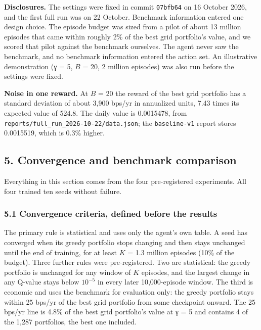 \documentclass[
  11pt]{article}
\begin{document}
\textbf{Disclosures.} The settings were fixed in commit \texttt{07bfb64}
on 16 October 2026, and the first full run was on 22 October. Benchmark
information entered one design choice. The episode budget was sized from
a pilot of about 13 million episodes that came within roughly 2\% of the
best grid portfolio's value, and we scored that pilot against the
benchmark ourselves. The agent never saw the benchmark, and no benchmark
information entered the action set. An illustrative demonstration (γ =
5, \(B\) = 20, 2 million episodes) was also run before the settings were
fixed.

\textbf{Noise in one reward.} At \(B\) = 20 the reward of the best grid
portfolio has a standard deviation of about 3,900 bps/yr in annualized
units, 7.43 times its expected value of 524.8. The daily value is
0.0015478, from \texttt{reports/full\_run\_2026-10-22/data.json}; the
\texttt{baseline-v1} report stores 0.0015519, which is 0.3\% higher.

\subsection{5. Convergence and benchmark
comparison}\label{convergence-and-benchmark-comparison}

Everything in this section comes from the four pre-registered
experiments. All four trained ten seeds without failure.

\subsubsection{5.1 Convergence criteria, defined before the
results}\label{convergence-criteria-defined-before-the-results}

The primary rule is statistical and uses only the agent's own table. A
seed has converged when its greedy portfolio stops changing and then
stays unchanged until the end of training, for at least \(K\) = 1.3
million episodes (10\% of the budget). Three further rules were
pre-registered. Two are statistical: the greedy portfolio is unchanged
for any window of \(K\) episodes, and the largest change in any Q-value
stays below \(10^{-5}\) in every later 10,000-episode window. The third
is economic and uses the benchmark for evaluation only: the greedy
portfolio stays within 25 bps/yr of the best grid portfolio from some
checkpoint onward. The 25 bps/yr line is 4.8\% of the best grid
portfolio's value at γ = 5 and contains 4 of the 1,287 portfolios, the
best one included.
\end{document}
